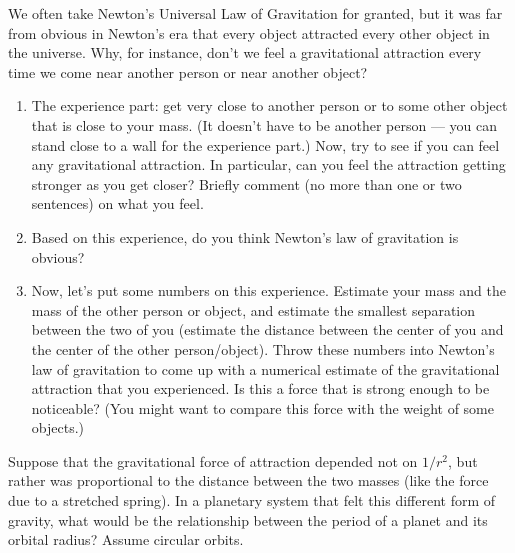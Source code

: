 \begin{exercise}
  We often take Newton's Universal Law of Gravitation for granted, but
  it was far from obvious in Newton's era that every object attracted
  every other object in the universe.  Why, for instance, don't we
  feel a gravitational attraction every time we come near another
  person or near another object?

  \begin{enumerate}
  \item The experience part: get very close to another person or to
    some other object that is close to your mass.  (It doesn't have to
    be another person --- you can stand close to a wall for the
    experience part.)  Now, try to see if you can feel any
    gravitational attraction.  In particular, can you feel the
    attraction getting stronger as you get closer?  Briefly comment
    (no more than one or two sentences) on what you feel.

  \item Based on this experience, do you think Newton's law of
    gravitation is obvious?

  \item Now, let's put some numbers on this experience.  Estimate your
    mass and the mass of the other person or object, and estimate the
    smallest separation between the two of you (estimate the distance
    between the center of you and the center of the other
    person/object).  Throw these numbers into Newton's law of
    gravitation to come up with a numerical estimate of the
    gravitational attraction that you experienced.  Is this a force
    that is strong enough to be noticeable?  (You might want to
    compare this force with the weight of some objects.)

  \end{enumerate}
\end{exercise}


\begin{exercise}
  Suppose that the gravitational force of attraction depended not on
  $1/r^2$, but rather was proportional to the distance between the two
  masses (like the force due to a stretched spring).  In a planetary
  system that felt this different form of gravity, what would be the
  relationship between the period of a planet and its orbital radius?
  Assume circular orbits.
  \label{prob:nonkeplerI}
\end{exercise}

